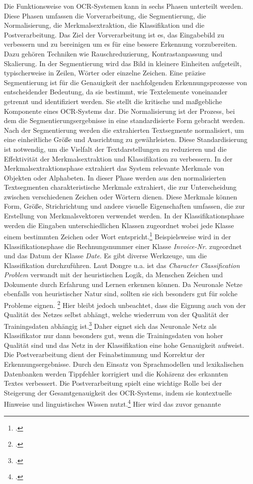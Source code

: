 Die Funktionsweise von OCR-Systemen kann in sechs Phasen unterteilt werden. Diese Phasen umfassen die Vorverarbeitung, die Segmentierung, die Normalisierung, die Merkmalsextraktion, die Klassifikation und die Postverarbeitung. Das Ziel der Vorverarbeitung ist es, das Eingabebild zu verbessern und zu bereinigen um es für eine bessere Erkennung vorzubereiten. Dazu gehören Techniken wie Rauschreduzierung, Kontrastanpassung und Skalierung. In der Segmentierung wird das Bild in kleinere Einheiten aufgeteilt, typischerweise in Zeilen, Wörter oder einzelne Zeichen. Eine präzise Segmentierung ist für die Genauigkeit der nachfolgenden Erkennungsprozesse von entscheidender Bedeutung, da sie bestimmt, wie Textelemente voneinander getrennt und identifiziert werden. Sie stellt die kritische und maßgebliche Komponente eines OCR-Systems dar. Die Normalisierung ist der Prozess, bei dem die Segmentierungsergebnisse in eine standardisierte Form gebracht werden. Nach der Segmentierung werden die extrahierten Textsegmente normalisiert, um eine einheitliche Größe und Ausrichtung zu gewährleisten. Diese Standardisierung ist notwendig, um die Vielfalt der Textdarstellungen zu reduzieren und die Effektivität der Merkmalsextraktion und Klassifikation zu verbessern. In der Merkmalsextraktionsphase extrahiert das System relevante Merkmale von Objekten oder Alphabeten. In dieser Phase werden aus den normalisierten Textsegmenten charakteristische Merkmale extrahiert, die zur Unterscheidung zwischen verschiedenen Zeichen oder Wörtern dienen. Diese Merkmale können Form, Größe, Strichrichtung und andere visuelle Eigenschaften umfassen, die zur Erstellung von Merkmalsvektoren verwendet werden. In der Klassifikationsphase werden die Eingaben unterschiedlichen Klassen zugeordnet wobei jede Klasse einem bestimmten Zeichen oder Wort entspricht.\footcites[Vgl.][S. 244]{hamad_detailed_2016} Beispielsweise wird in der Klassifikationsphase die Rechnungsnummer einer Klasse \emph{Invoice-Nr.} zugeordnet und das Datum der Klasse \emph{Date}. Es gibt diverse Werkzeuge, um die Klassifikation durchzuführen. Laut Dongre u.a. ist das \emph{Character Classification Problem} verwandt mit der heuristischen Logik, da Menschen Zeichen und Dokumente durch Erfahrung und Lernen erkennen können. Da Neuronale Netze ebenfalls von heuristischer Natur sind, sollten sie sich besonders gut für solche Probleme eignen. \footcites[Vgl.][S. 11]{dongre_review_2010} Hier bleibt jedoch unbeachtet, dass die Eignung auch von der Qualität des Netzes selbst abhängt, welche wiederrum von der Qualität der Trainingsdaten abhängig ist.\footcites[Vgl.][S. 851]{kavzoglu_increasing_2009} Daher eignet sich das Neuronale Netz als Klassifikator nur dann besonders gut, wenn die Trainingsdaten von hoher Qualität sind und das Netz in der Klassifikation eine hohe Genauigkeit aufweist. Die Postverarbeitung dient der Feinabstimmung und Korrektur der Erkennungsergebnisse. Durch den Einsatz von Sprachmodellen und lexikalischen Datenbanken werden Tippfehler korrigiert und die Kohärenz des erkannten Textes verbessert. Die Postverarbeitung spielt eine wichtige Rolle bei der Steigerung der Gesamtgenauigkeit des OCR-Systems, indem sie kontextuelle Hinweise und linguistisches Wissen nutzt.\footcites[Vgl.][S. 246 f.]{hamad_detailed_2016} Hier wird das zuvor genannte 